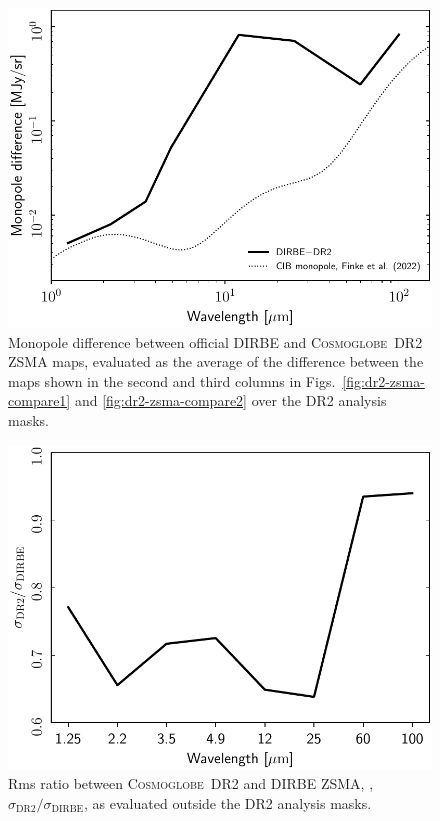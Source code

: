 \documentclass[twocolumn]{aa}
\newcommand{\cosmoglobe}{\textsc{Cosmoglobe}}
\begin{document}
\begin{figure}
    \centering
    \includegraphics[width=\linewidth]{figs/zodi_mean_diff_DIRBE_DR2.pdf}
    \caption{Monopole difference between official DIRBE and
      \cosmoglobe\ DR2 ZSMA maps, evaluated as the average of the
      difference between the maps shown in the second and third
      columns in Figs.~\ref{fig:dr2-zsma-compare1} and
      \ref{fig:dr2-zsma-compare2} over the DR2 analysis masks.}
    \label{fig:zsma_mean}
\end{figure}

\begin{figure}
    \centering
    \includegraphics[width=\linewidth]{figs/zodi_rms_ratio_DIRBE_DR2_v2.pdf}
    \caption{Rms ratio between \cosmoglobe\ DR2 and DIRBE ZSMA, ,
      $\sigma_{\mathrm{DR2}}/\sigma_\mathrm{DIRBE}$,
      as evaluated outside the DR2 analysis masks.}
    \label{fig:zsma_rms}
\end{figure}
\end{document}
